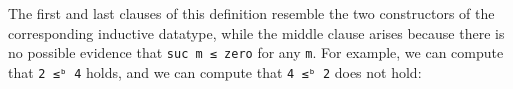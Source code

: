 \begin{fence}
\begin{code}%
\>[0]\AgdaSpace{}%
\AgdaSpace{}%
\<%
\\
%
\\[\AgdaEmptyExtraSkip]%
\>[0]\AgdaSpace{}%
\AgdaSymbol{:}\AgdaSpace{}%
\AgdaSpace{}%
\AgdaSpace{}%
\AgdaSpace{}%
\AgdaSpace{}%
\<%
\\
\>[0]\AgdaSpace{}%
\AgdaSpace{}%
%
\>[16]\AgdaSymbol{=}%
\>[19]\<%
\\
\>[0]\AgdaSpace{}%
\AgdaSpace{}%
\AgdaSpace{}%
%
\>[16]\AgdaSymbol{=}%
\>[19]\<%
\\
\>[0]\AgdaSpace{}%
\AgdaSpace{}%
\AgdaSpace{}%
\AgdaSpace{}%
%
\>[16]\AgdaSymbol{=}%
\>[19]\AgdaSpace{}%
\AgdaSpace{}%
\<%
\end{code}
\end{fence}

The first and last clauses of this definition resemble the two
constructors of the corresponding inductive datatype, while the middle
clause arises because there is no possible evidence that
\texttt{suc\ m\ ≤\ zero} for any \texttt{m}. For example, we can compute
that \texttt{2\ ≤ᵇ\ 4} holds, and we can compute that \texttt{4\ ≤ᵇ\ 2}
does not hold:

